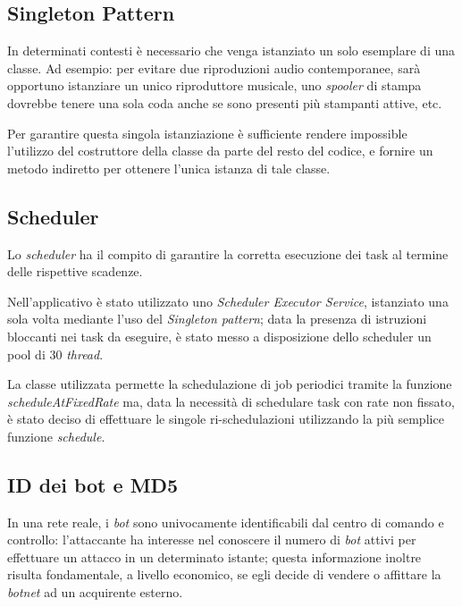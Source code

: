 \vspace*{0.5cm}
\subsection{Singleton Pattern}
In determinati contesti \`e necessario che venga istanziato un solo esemplare di una classe. Ad esempio: per evitare due riproduzioni audio contemporanee, sar\`{a} opportuno istanziare un unico riproduttore musicale,
uno \textit{spooler} di stampa dovrebbe tenere una sola coda anche se sono presenti pi\`{u} stampanti attive,
etc.

Per garantire questa singola istanziazione \`{e} sufficiente rendere impossible l'utilizzo del costruttore della classe da parte del resto del codice, e fornire un metodo indiretto per ottenere l'unica istanza di tale classe.

\vspace*{0.5cm}
\subsection{Scheduler}
Lo \textit{scheduler} ha il compito di garantire la corretta esecuzione dei task al termine delle rispettive scadenze.

Nell'applicativo \`{e} stato utilizzato uno \textit{Scheduler Executor Service}, istanziato una sola volta mediante l'uso del \textit{Singleton pattern}; data la presenza di istruzioni bloccanti nei task da eseguire, \`{e} stato messo a disposizione dello scheduler un pool di $30$ \textit{thread}.

La classe utilizzata permette la schedulazione di job periodici tramite la funzione \textit{scheduleAtFixedRate} ma, data la necessit\`{a} di schedulare task con rate non fissato, \`{e} stato deciso di effettuare le singole ri-schedulazioni utilizzando la pi\`{u} semplice funzione \textit{schedule}.


\vspace*{0.5cm}
\subsection{ID dei bot e MD5}
In una rete reale, i \textit{bot} sono univocamente identificabili dal centro di comando e controllo:
l'attaccante ha interesse nel conoscere il numero di \textit{bot} attivi per effettuare un attacco in un determinato istante; questa informazione inoltre risulta fondamentale, a livello economico, se egli decide di vendere o affittare la \textit{botnet} ad un acquirente esterno. 

